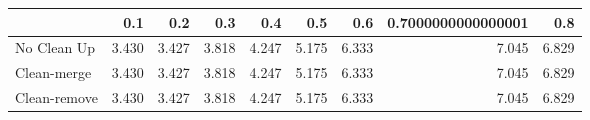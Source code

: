 \begin{tabular}{lrrrrrrrr}
\toprule
{} &   0.1 &   0.2 &   0.3 &   0.4 &   0.5 &   0.6 & 0.7000000000000001 &   0.8 \\
\midrule
No Clean Up  & 3.430 & 3.427 & 3.818 & 4.247 & 5.175 & 6.333 &              7.045 & 6.829 \\
Clean-merge  & 3.430 & 3.427 & 3.818 & 4.247 & 5.175 & 6.333 &              7.045 & 6.829 \\
Clean-remove & 3.430 & 3.427 & 3.818 & 4.247 & 5.175 & 6.333 &              7.045 & 6.829 \\
\bottomrule
\end{tabular}
